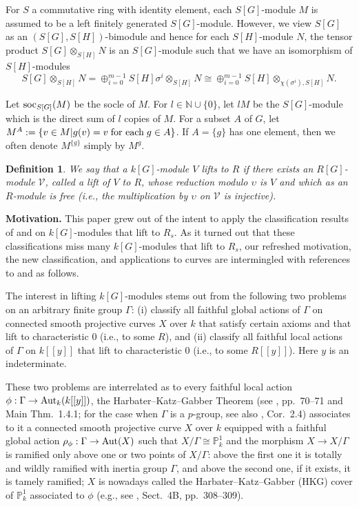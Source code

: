 \documentclass[11pt]{amsart}
\newtheorem{definition}[theorem]{Definition}
\def\Aut{\textup{Aut}}
\def\soc{\textup{soc}}
\begin{document}
For $S$ a commutative ring with identity element, each $S[G]$-module $M$ is assumed to be a left finitely generated $S[G]$-module. However, we view $S[G]$ as an $(S[G],S[H])$-bimodule and hence for each $S[H]$-module $N$, the tensor product $S[G]\otimes_{S[H]} N$ is an $S[G]$-module such that we have an isomorphism of $S[H]$-modules
\begin{equation}\label{EQ1}
S[G]\otimes_{S[H]} N=\oplus_{i=0}^{m-1} S[H]\sigma^{i}\otimes_{S[H]} N\cong\oplus_{i=0}^{m-1} S[H]\otimes_{\chi(\sigma^i),S[H]} N.
\end{equation} 

Let $\soc_{S[G]}(M)$ be the socle of $M$. For $l\in\mathbb N\cup\{0\}$, let $lM$ be the $S[G]$-module which is the direct sum of $l$ copies of $M$. For a subset $A$ of $G$, let $M^A:=\{v\in M|g(v)=v\;\textup{for each}\; g\in A\}$. If $A=\{g\}$ has one element, then we often denote $M^{\{g\}}$ simply by $M^g$. 

\begin{definition}\label{D1}
We say that a $k[G]$-module $V$ lifts to $R$ if there exists an $R[G]$-module $\mathcal V$, called a lift of $V$ to $R$, whose reduction modulo $\upsilon$ is $V$ and which as an $R$-module is free (i.e., the multiplication by $\upsilon$ on $\mathcal V$ is injective).
\end{definition}

{\bf Motivation.} This paper grew out of the intent to apply the classification results of \cite{KT1} and \cite{KT2} on $k[G]$-modules that lift to $R_s$. As it turned out that these classifications miss many $k[G]$-modules that lift to $R_s$, our refreshed motivation, the new classification, and applications to curves are intermingled with references to  \cite{KT1} and \cite{KT2} as follows.

The interest in lifting $k[G]$-modules stems out from the following two problems on an arbitrary finite group $\Gamma$: (i) classify all faithful global actions of $\Gamma$ on connected smooth projective curves $X$ over $k$ that satisfy certain axioms and that lift to characteristic $0$ (i.e., to some $R$), and (ii) classify all faithful local actions of $\Gamma$ on $k[[y]]$ that lift to characteristic $0$ (i.e., to some $R[[y]]$). Here $y$ is an indeterminate. 

These two problems are interrelated as to every faithful local action $\break\phi:\Gamma\rightarrow \Aut_k(k[[y]])$, the Harbater--Katz--Gabber Theorem (see \cite{K}, pp.\ 70--71 and Main Thm.\ 1.4.1; for the case when $\Gamma$ is a $p$-group, see also \cite{H}, Cor.\ 2.4) associates to it a connected smooth projective curve $X$ over $k$ equipped with a faithful global action $\rho_{\phi}:\Gamma\rightarrow\Aut(X)$ such that $X/\Gamma\cong \mathbb P^1_k$ and the morphism $X\rightarrow X/\Gamma$ is ramified only above one or two points of $X/\Gamma$: above the first one it is totally and wildly ramified with inertia group $\Gamma$, and above the second one, if it exists, it is tamely ramified; $X$ is nowadays called the Harbater--Katz--Gabber (HKG) cover of $\mathbb P^1_k$ associated to $\phi$ (e.g., see \cite{P}, Sect.\ 4B, pp.\ 308--309).
\end{document}
